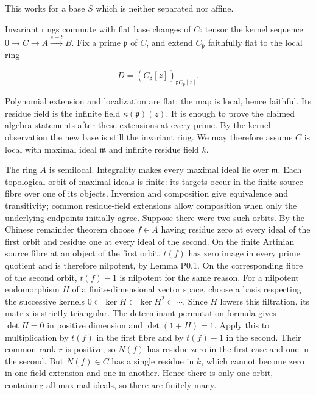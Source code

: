 \documentclass[11pt,a4paper,openany]{report}
\begin{document}
This works for a base \(S\) which is neither separated nor affine.

Invariant rings commute with flat base changes of \(C\): tensor the kernel sequence \(0\to C\to A\xrightarrow{s-t}B\). Fix a prime \(\mathfrak p\) of \(C\), and extend \(C_{\mathfrak p}\) faithfully flat to the local ring

\[
D=(C_{\mathfrak p}[z])_{\mathfrak p C_{\mathfrak p}[z]}.
\]

Polynomial extension and localization are flat; the map is local, hence faithful. Its residue field is the infinite field \(\kappa(\mathfrak p)(z)\). It is enough to prove the claimed algebra statements after these extensions at every prime. By the kernel observation the new base is still the invariant ring. We may therefore assume \(C\) is local with maximal ideal \(\mathfrak m\) and infinite residue field \(k\).

The ring \(A\) is semilocal. Integrality makes every maximal ideal lie over \(\mathfrak m\). Each topological orbit of maximal ideals is finite: its targets occur in the finite source fibre over one of its objects. Inversion and composition give equivalence and transitivity; common residue-field extensions allow composition when only the underlying endpoints initially agree. Suppose there were two such orbits. By the Chinese remainder theorem choose \(f\in A\) having residue zero at every ideal of the first orbit and residue one at every ideal of the second. On the finite Artinian source fibre at an object of the first orbit, \(t(f)\) has zero image in every prime quotient and is therefore nilpotent, by Lemma P0.1. On the corresponding fibre of the second orbit, \(t(f)-1\) is nilpotent for the same reason. For a nilpotent endomorphism \(H\) of a finite-dimensional vector space, choose a basis respecting the successive kernels \(0\subset\ker H\subset\ker H^2\subset\cdots\). Since \(H\) lowers this filtration, its matrix is strictly triangular. The determinant permutation formula gives \(\det H=0\) in positive dimension and \(\det(1+H)=1\). Apply this to multiplication by \(t(f)\) in the first fibre and by \(t(f)-1\) in the second. Their common rank \(r\) is positive, so \(N(f)\) has residue zero in the first case and one in the second. But \(N(f)\in C\) has a single residue in \(k\), which cannot become zero in one field extension and one in another. Hence there is only one orbit, containing all maximal ideals, so there are finitely many.
\end{document}
